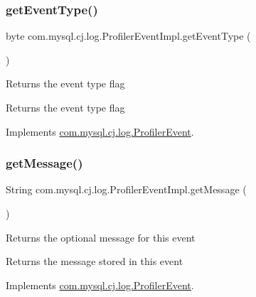 \subsubsection{\texorpdfstring{get\+Event\+Type()}{getEventType()}}
{\footnotesize\ttfamily byte com.\+mysql.\+cj.\+log.\+Profiler\+Event\+Impl.\+get\+Event\+Type (\begin{DoxyParamCaption}{ }\end{DoxyParamCaption})}

Returns the event type flag

\begin{DoxyReturn}{Returns}
the event type flag 
\end{DoxyReturn}


Implements \mbox{\hyperlink{interfacecom_1_1mysql_1_1cj_1_1log_1_1_profiler_event_a5bc617e47a2d49ad356c17bd45f5be0d}{com.\+mysql.\+cj.\+log.\+Profiler\+Event}}.

\mbox{\label{classcom_1_1mysql_1_1cj_1_1log_1_1_profiler_event_impl_aea930b7a299a44946aea7544c5df2a7d}} 
\subsubsection{\texorpdfstring{get\+Message()}{getMessage()}}
{\footnotesize\ttfamily String com.\+mysql.\+cj.\+log.\+Profiler\+Event\+Impl.\+get\+Message (\begin{DoxyParamCaption}{ }\end{DoxyParamCaption})}

Returns the optional message for this event

\begin{DoxyReturn}{Returns}
the message stored in this event 
\end{DoxyReturn}


Implements \mbox{\hyperlink{interfacecom_1_1mysql_1_1cj_1_1log_1_1_profiler_event_aebc12f64998b49e30c39a61e08f34a2c}{com.\+mysql.\+cj.\+log.\+Profiler\+Event}}.

\mbox{\label{classcom_1_1mysql_1_1cj_1_1log_1_1_profiler_event_impl_a2b432bffc0257f4825222bb9946a44ba}} 
